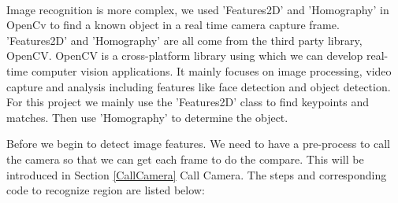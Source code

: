 \paragraph{}Image recognition is more complex, we used 'Features2D' and 'Homography' in OpenCv to find a known object in a real time camera capture frame. 'Features2D' and 'Homography' are all come from the third party library, OpenCV. OpenCV is a cross-platform library using which we can develop real-time computer vision applications. It mainly focuses on image processing, video capture and analysis including features like face detection and object detection. For this project we mainly use the 'Features2D' class to find keypoints and matches. Then use 'Homography' to determine the object.
\par Before we begin to detect image features. We need to have a pre-process to call the camera so that we can get each frame to do the compare. This will be introduced in Section \ref{CallCamera} Call Camera. The steps and corresponding code to recognize region are listed below:
